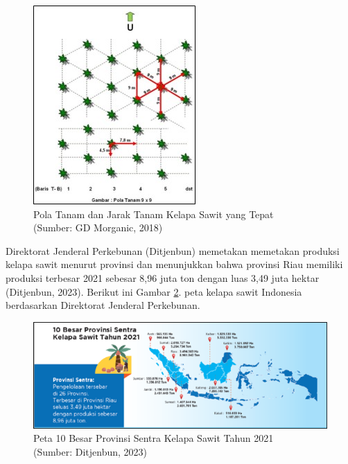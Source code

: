 \begin{figure}[H]
	\vspace{-0.1cm}
	\begin{center}
		\includegraphics[width=0.5\columnwidth]{bab1/Gambar/Picture2.jpg}
	\end{center}
	\vspace{-0.2cm}
	\caption{Pola Tanam dan Jarak Tanam Kelapa Sawit yang Tepat\\(Sumber: GD Morganic, 2018)}\label{img:bab1-Pola-Tanam-dan-Jarak-Tanam}
\end{figure}

Direktorat Jenderal Perkebunan (Ditjenbun) memetakan memetakan produksi kelapa sawit menurut provinsi dan menunjukkan bahwa provinsi Riau memiliki produksi terbesar 2021 sebesar 8,96 juta ton dengan luas 3,49 juta hektar (Ditjenbun, 2023). Berikut ini Gambar \ref{img:bab1-Peta-10-Besar-Provinsi}. peta kelapa sawit Indonesia berdasarkan Direktorat Jenderal Perkebunan.

\begin{figure}[H]
	\vspace{-0.1cm}
	\begin{center}
		\includegraphics[width=1\columnwidth]{bab1/Gambar/Picture3.png}
	\end{center}
	\vspace{-0.2cm}
	\caption{Peta 10 Besar Provinsi Sentra Kelapa Sawit Tahun 2021\\(Sumber: Ditjenbun, 2023)}\label{img:bab1-Peta-10-Besar-Provinsi}
\end{figure}

